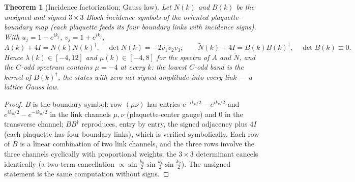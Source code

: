 \documentclass[11pt]{article}
\newtheorem{theorem}{Theorem}[section]
\newcommand{\Nt}{\widetilde N}
\begin{document}
\begin{theorem}[Incidence factorization; Gauss law]\label{thm:gausslaw}
Let $N(k)$ and $B(k)$ be the unsigned and signed $3\times3$ Bloch incidence
symbols of the oriented plaquette-boundary map (each plaquette feeds its four
boundary links with incidence signs). With $u_j=1-e^{ik_j}$,
$v_j=1+e^{ik_j}$,
\begin{equation}
A(k)+4I=N(k)N(k)^\dagger,\quad \det N(k)=-2v_1v_2v_3;
\qquad
\Nt(k)+4I=B(k)B(k)^\dagger,\quad \det B(k)\equiv0 .
\end{equation}
Hence $\lambda(k)\in[-4,12]$ and $\mu(k)\in[-4,8]$ for the spectra of $A$
and $\Nt$, and the $C$-odd spectrum contains $\mu=-4$ \emph{at every} $k$:
the lowest $C$-odd band is the kernel of $B(k)^\dagger$, the states with zero
net signed amplitude into every link --- a lattice Gauss law.
\end{theorem}

\begin{proof}
$B$ is the boundary symbol: row $(\mu\nu)$ has entries
$e^{-ik_\nu/2}-e^{ik_\nu/2}$ and $e^{ik_\mu/2}-e^{-ik_\mu/2}$ in the link
channels $\mu,\nu$ (plaquette-center gauge) and $0$ in the transverse
channel; $BB^\dagger$ reproduces, entry by entry, the signed adjacency plus
$4I$ (each plaquette has four boundary links), which is verified symbolically.
Each row of $B$ is a linear combination of two link channels, and the three
rows involve the three channels cyclically with proportional weights; the
$3\times3$ determinant cancels identically (a two-term cancellation
$\propto \sin\tfrac{k_0}{2}\sin\tfrac{k_1}{2}\sin\tfrac{k_2}{2}$). The unsigned statement is the
same computation without signs.
\end{proof}
\end{document}
